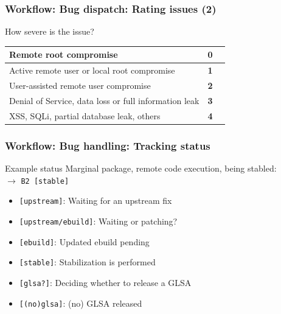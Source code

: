 \documentclass[svgnames]{beamer}
\begin{document}
\begin{frame}[fragile]
  \frametitle{Workflow: Bug dispatch: Rating issues (2)}
  
  \begin{block}{How severe is the issue?}
    \begin{center}
    \begin{tabular}{l|cc}
      Remote root compromise & \textbf{0} \\
      \hline
      Active remote user or local root compromise & \textbf{1} \\
      \hline
      User-assisted remote user compromise & \textbf{2} \\
      \hline      
      Denial of Service, data loss or full information leak & \textbf{3} \\
      \hline
      XSS, SQLi, partial database leak, others & \textbf{4} \\
    \end{tabular}
    \end{center}
  \end{block}
\end{frame}

\begin{frame}
  \frametitle{Workflow: Bug handling: Tracking status}
  
  \begin{block}{Example status}
    Marginal package, remote code execution, being stabled: \\ $\rightarrow$ \texttt{B2 [stable]}
  \end{block}

  \begin{itemize}
    \item \texttt{[upstream]}: Waiting for an upstream fix
    \item \texttt{[upstream/ebuild]}: Waiting or patching?
    \item \texttt{[ebuild]}: Updated ebuild pending
    \item \texttt{[stable]}: Stabilization is performed
    \item \texttt{[glsa?]}: Deciding whether to release a GLSA
    \item \texttt{[(no)glsa]}: (no) GLSA released
  \end{itemize}

\end{frame}
\end{document}
